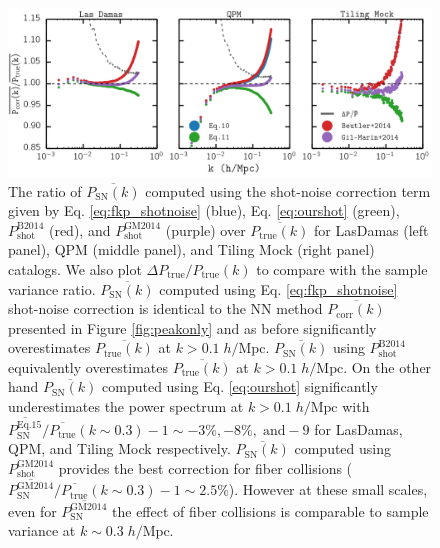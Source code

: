 \documentclass{emulateapj}
\begin{document}
\begin{figure}
\begin{center}
\includegraphics[scale=0.55]{fcpaper_pk_shotnoiseonly_comp.png}
\caption{The ratio of $\overline{P_\mathrm{SN}(k)}$ computed using the shot-noise correction term given by Eq. \ref{eq:fkp_shotnoise} (blue), Eq. \ref{eq:ourshot} (green), $P^\mathrm{B2014}_\mathrm{shot}$ (red), and $P^{\mathrm{GM2014}}_\mathrm{shot}$ (purple) over $\overline{P_\mathrm{true}(k)}$ for LasDamas (left panel), QPM (middle panel), and Tiling Mock (right panel) catalogs. We also plot $\Delta P_\mathrm{true}/P_\mathrm{true}(k)$ to compare with the sample variance ratio. $\overline{P_\mathrm{SN}(k)}$ computed using Eq. \ref{eq:fkp_shotnoise} shot-noise correction is identical to the NN method $\overline{P_\mathrm{corr}(k)}$ presented in Figure \ref{fig:peakonly} and as before significantly overestimates $\overline{P_\mathrm{true}(k)}$ at $k > 0.1 \; h/\mathrm{Mpc}$. $\overline{P_\mathrm{SN}(k)}$ using $P^\mathrm{B2014}_\mathrm{shot}$ equivalently overestimates $\overline{P_\mathrm{true}(k)}$ at $k > 0.1 \; h/\mathrm{Mpc}$. On the other hand $\overline{P_\mathrm{SN}(k)}$ computed using Eq. \ref{eq:ourshot} significantly underestimates the power spectrum at $k > 0.1 \; h/\mathrm{Mpc}$ with $\overline{P^\mathrm{Eq.15}_\mathrm{SN}}/\overline{P_\mathrm{true}}(k \sim 0.3) -1 \sim -3 \%, -8 \%, \;\mathrm{and} -9$ for LasDamas, QPM, and Tiling Mock respectively. $\overline{P_\mathrm{SN}(k)}$ computed using $P^\mathrm{GM2014}_\mathrm{shot}$ provides the best correction for fiber collisions ($\overline{P^\mathrm{GM2014}_\mathrm{SN}}/\overline{P_\mathrm{true}}(k \sim 0.3) -1 \sim 2.5 \%$). However at these small scales, even for $\overline{P^\mathrm{GM2014}_\mathrm{SN}}$ the effect of fiber collisions is comparable to sample variance at $k \sim 0.3 \;h/\mathrm{Mpc}$. } \label{fig:shotnoise}
\end{center}
\end{figure}
\end{document}
